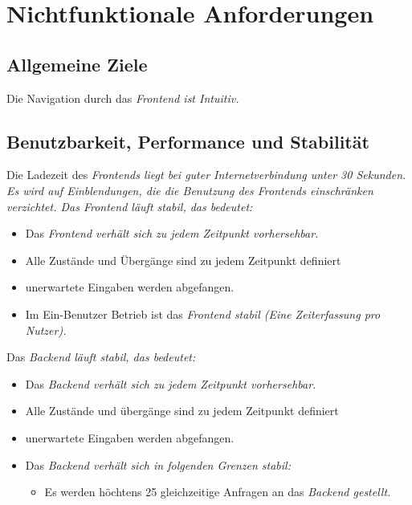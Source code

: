 \section{Nichtfunktionale Anforderungen}

\subsection{Allgemeine Ziele}
\begin{requirements}
     Die Navigation durch das \em{Frontend} ist Intuitiv.
\end{requirements}

\subsection{Benutzbarkeit, Performance und Stabilität}
\begin{requirements}
     Die Ladezeit des \em{Frontends} liegt bei guter Internetverbindung unter 30 Sekunden.
     Es wird auf Einblendungen, die die Benutzung des \em{Frontends} einschränken verzichtet.
     Das \em{Frontend} läuft stabil, das bedeutet:
     \begin{itemize}
        \item Das \em{Frontend} verhält sich zu jedem Zeitpunkt vorhersehbar.
        \item Alle Zustände und Übergänge sind zu jedem Zeitpunkt definiert
        \item unerwartete Eingaben werden abgefangen.
        \item Im Ein-Benutzer Betrieb ist das \em{Frontend} stabil (Eine Zeiterfassung pro Nutzer).
     \end{itemize}
      Das \em{Backend} läuft stabil, das bedeutet:
          \begin{itemize}
             \item Das \em{Backend} verhält sich zu jedem Zeitpunkt vorhersehbar.
             \item Alle Zustände und übergänge sind zu jedem Zeitpunkt definiert
             \item unerwartete Eingaben werden abgefangen.
             \item Das \em{Backend} verhält sich in folgenden Grenzen stabil:
	         \begin{itemize}
                    \item Es werden höchtens 25 gleichzeitige Anfragen an das \em{Backend} gestellt.
             \end{itemize}
          \end{itemize}
\end{requirements}

